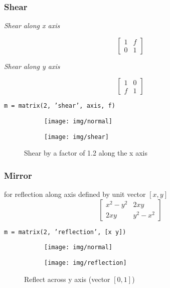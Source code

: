 \documentclass{scrartcl}
\begin{document}
\subsubsection*{Shear}
\noindent
\begin{center}
	\begin{minipage}{.3\linewidth}
		\begin{center}\textit{Shear along x axis}
		\end{center}
	$$\left[ \begin{smallmatrix} 
	1 & f\\
	0 & 1
	\end{smallmatrix} \right]$$
\end{minipage}%
\begin{minipage}{.3\linewidth}
			\begin{center}\textit{Shear along y axis}
			\end{center}
	$$\left[ \begin{smallmatrix} 
	1 & 0\\
	f & 1
	\end{smallmatrix} \right]$$
\end{minipage}
\end{center}
\begin{center}
	\texttt{m = matrix(2, 'shear', axis, f)}
\end{center}
\begin{figure}[H]
	\centering
	\begin{subfigure}{.41\textwidth}
		\centering
		\texttt{[image: img/normal]}
	\end{subfigure}%
	\begin{subfigure}{.41\textwidth}
		\centering
		\texttt{[image: img/shear]}
	\end{subfigure}
	\caption{Shear by a factor of 1.2 along the x axis}
	\label{fig:rot}
\end{figure}

\subsubsection*{Mirror}
for reflection along axis defined by unit vector $[x,y]$
$$\left[ \begin{smallmatrix} 
x^2 - y^2 & 2xy\\
2xy & y^2 - x^2 
\end{smallmatrix} \right]$$
\begin{center}
	\texttt{m = matrix(2, 'reflection', [x y])}
\end{center}
\begin{figure}[H]
	\centering
	\begin{subfigure}{.41\textwidth}
		\centering
		\texttt{[image: img/normal]}
	\end{subfigure}%
	\begin{subfigure}{.41\textwidth}
		\centering
		\texttt{[image: img/reflection]}
	\end{subfigure}
	\caption{Reflect across y axis (vector $[0,1]$)}
	\label{fig:rot}
\end{figure}
\end{document}
